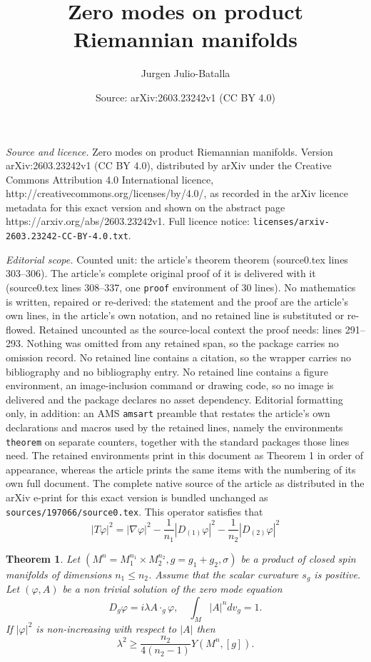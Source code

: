 \documentclass[10pt,a4paper]{amsart}
\title{Zero modes on product Riemannian manifolds}
\author{Jurgen Julio-Batalla}
\date{Source: arXiv:2603.23242v1 (CC BY 4.0)}
\newtheorem{theorem}{Theorem}
\begin{document}
\maketitle

\noindent\emph{Source and licence.} Zero modes on product Riemannian manifolds. Version arXiv:2603.23242v1 (CC BY 4.0), distributed by arXiv under the Creative Commons Attribution 4.0 International licence, http://creativecommons.org/licenses/by/4.0/, as recorded in the arXiv licence metadata for this exact version and shown on the abstract page https://arxiv.org/abs/2603.23242v1. Full licence notice: \texttt{licenses/arxiv-2603.23242-CC-BY-4.0.txt}.\par\smallskip

\noindent\textit{Editorial scope.} Counted unit: the article's theorem theorem (source0.tex lines 303--306). The article's complete original proof of it is delivered with it (source0.tex lines 308--337, one \texttt{proof} environment of 30 lines). No mathematics is written, repaired or re-derived: the statement and the proof are the article's own lines, in the article's own notation, and no retained line is substituted or re-flowed.  Retained uncounted as the source-local context the proof needs: lines 291--293.  Nothing was omitted from any retained span, so the package carries no omission record.  No retained line contains a citation, so the wrapper carries no bibliography and no bibliography entry.  No retained line contains a figure environment, an image-inclusion command or drawing code, so no image is delivered and the package declares no asset dependency.  Editorial formatting only, in addition: an AMS \texttt{amsart} preamble that restates the article's own declarations and macros used by the retained lines, namely the environments \texttt{theorem} on separate counters, together with the standard packages those lines need.  The retained environments print in this document as Theorem 1 in order of appearance, whereas the article prints the same items with the numbering of its own full document.  The complete native source of the article as distributed in the arXiv e-print for this exact version is bundled unchanged as \texttt{sources/197066/source0.tex}.
This operator satisfies that \begin{equation}\label{decompositionT}
|T\varphi|^2=|\nabla\varphi|^2-\frac{1}{n_1}|D_{(1)}\varphi|^2-\frac{1}{n_2}|D_{(2)}\varphi|^2
\end{equation}

\begin{theorem}
Let $(M^n=M_1^{n_1}\times M_2^{n_2},g=g_1+g_2,\sigma)$ be a product of closed spin manifolds of dimensions $n_1\leq n_2$. Assume that the scalar curvature $s_g$ is positive. Let $(\varphi,A)$ be a non trivial solution of the zero mode equation $$D_g\varphi=i\lambda A\cdot_g\varphi,\quad\int_M |A|^ndv_g=1. $$
If $|\varphi|^2$ is non-increasing with respect to $|A|$ then $$\lambda^2\geq \frac{n_2}{4(n_2-1)}Y(M^n,[g]).$$
\end{theorem}
\end{document}

